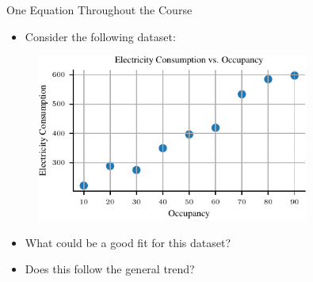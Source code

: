 \documentclass[handout]{beamer}
\begin{document}
    
    
    
    
    

    \begin{frame}{One Equation Throughout the Course}
        \begin{itemize}
            \item Consider the following dataset:
        \end{itemize}
    \begin{figure}
        \centering
        \includegraphics[width=0.8\textwidth]{../figures/introduction-madhav/data.pdf}
    \end{figure}
    \begin{itemize}
        \item What could be a good fit for this dataset?
        \item Does this follow the general trend?
    \end{itemize}
    \end{frame}
\end{document}
